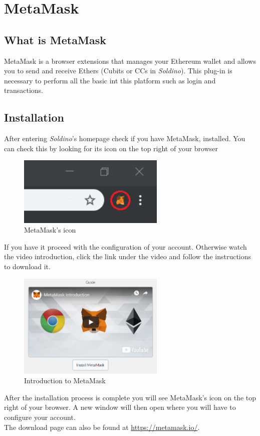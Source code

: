 \section{MetaMask}
	\subsection{What is MetaMask}
	MetaMask is a browser extensions that manages your Ethereum wallet and 
	allows you to send and receive Ethers (Cubits or CCs in \textit{Soldino}). 
	This plug-in is necessary to perform all the basic int this platform
	such as login and transactions. 
	\subsection{Installation}
	After entering \textit{Soldino}'s homepage check if you have MetaMask, 
	installed. You can check this by looking for its icon on the top right of 
	your browser
	\begin{figure}[H]
		\includegraphics[width=7cm]{res/images/metamask_icon.png}
		\centering
		\caption{MetaMask's icon}
	\end{figure}
	\noindent If you have it proceed with the configuration of your account.
	Otherwise watch the video introduction, click the link under the video and 
	follow the instructions to download it. 
	\begin{figure}[H]
		\includegraphics[width=7cm]{res/images/metamask_download.png}
		\centering
		\caption{Introduction to MetaMask}
	\end{figure}
	\noindent After the installation process is 
	complete you will see MetaMask's icon on the top right of your browser. A 
	new window will then open where you will have to configure your account.\\
	The download page can also be found at \url{https://metamask.io/}.
